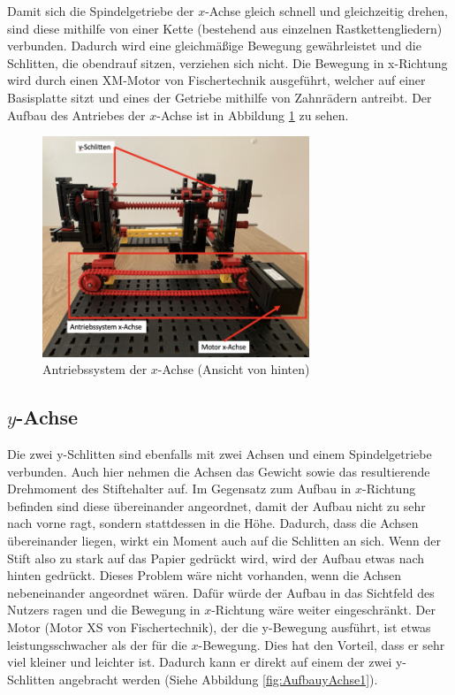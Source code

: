 \documentclass[conference,compsoc,final,a4paper]{IEEEtran}
\begin{document}
Damit sich die Spindelgetriebe der $x$-Achse gleich schnell und gleichzeitig drehen, sind diese mithilfe von einer Kette (bestehend aus einzelnen
Rastkettengliedern) verbunden. Dadurch wird eine gleichmäßige Bewegung gewährleistet und die Schlitten, die obendrauf sitzen,
verziehen sich nicht. Die Bewegung in x-Richtung wird durch einen XM-Motor von Fischertechnik ausgeführt, welcher auf einer
Basisplatte sitzt und eines der Getriebe mithilfe von Zahnrädern antreibt. Der Aufbau des Antriebes der $x$-Achse ist in Abbildung \ref{fig:AufbauxAchse} zu sehen.


\begin{figure}[h]
\centering
\includegraphics[width=8cm]{../images/xAchse1.png}
\caption{Antriebssystem der $x$-Achse (Ansicht von hinten)}
\label{fig:AufbauxAchse}
\end{figure}

\subsection{$y$-Achse}

Die zwei y-Schlitten sind ebenfalls mit zwei Achsen und einem Spindelgetriebe verbunden. Auch hier nehmen die Achsen das Gewicht
sowie das resultierende Drehmoment des Stiftehalter auf. Im Gegensatz zum Aufbau in $x$-Richtung befinden sind diese übereinander angeordnet,
damit der Aufbau nicht zu sehr nach vorne ragt, sondern stattdessen in die Höhe. Dadurch, dass die Achsen übereinander liegen, wirkt ein Moment auch auf die Schlitten an sich. Wenn der Stift also zu stark auf das Papier gedrückt wird, wird der Aufbau etwas nach hinten gedrückt. Dieses Problem wäre nicht vorhanden, wenn die Achsen nebeneinander angeordnet wären. Dafür würde der Aufbau in das Sichtfeld des Nutzers ragen und die Bewegung in $x$-Richtung wäre weiter eingeschränkt. 
Der Motor (Motor XS von Fischertechnik), der die y-Bewegung ausführt, ist etwas leistungsschwacher als der für die $x$-Bewegung. Dies hat
den Vorteil, dass er sehr viel kleiner und leichter ist. Dadurch kann er direkt auf einem der zwei y-Schlitten angebracht werden (Siehe Abbildung \ref{fig:AufbauyAchse1}). 
\end{document}
